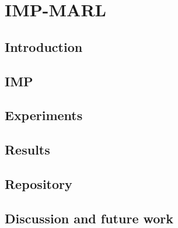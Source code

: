 \chapter{IMP-MARL}\label{ch:impmarl}
\section{Introduction}
\section{IMP}
\section{Experiments}
\section{Results}
\section{Repository}
\section{Discussion and future work}